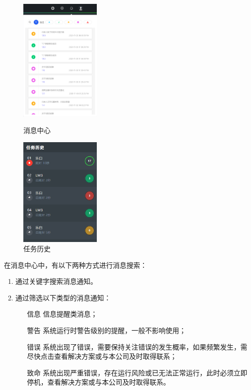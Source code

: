 \begin{figure}[htb]
	\centering
	\begin{minipage}[t]{0.5\linewidth}
		\centering
		\includegraphics[width=4cm]{screen/2-14.png}
		\caption{消息中心}
		\label{fig:消息中心}
	\end{minipage}
	\hfill
	\begin{minipage}[t]{0.45\linewidth}
		\centering
		\includegraphics[width=4cm]{image/07/图2.13 任务历史.png}
		\caption{任务历史}
		\label{fig:任务历史}
	\end{minipage}
\end{figure}
在消息中心中，有以下两种方式进行消息搜索：
\begin{enumerate}
	\item 通过关键字搜索消息通知。
	\item 通过筛选以下类型的消息通知：
	\begin{itemize}
\item[\icn{image/29.pdf} 信息] 信息提醒类消息；
\item[\icn{image/28.pdf} 警告] 系统运行时警告级别的提醒，一般不影响使用；
\item[\icn{image/27.pdf} 错误] 系统出现了错误，需要保持关注错误的发生概率，如果频繁发生，需尽快点击查看解决方案或与本公司及时取得联系；
\item[\icn{image/26.pdf} 致命] 系统出现严重错误，存在运行风险或已无法正常运行，此时必须立即停机，查看解决方案或与本公司及时取得联系。
	\end{itemize}
\end{enumerate}

